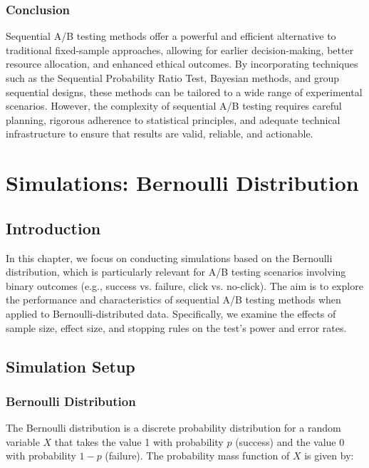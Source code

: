 \documentclass[magisterska, english]{pwr_wmat_praca_dyplomowa}
\theoremstyle{plain}
\numberwithin{theorem}{chapter}
\theoremstyle{definition}
\numberwithin{theorem}{chapter}
\begin{document}
\subsection{Conclusion}

Sequential A/B testing methods offer a powerful and efficient alternative to traditional fixed-sample approaches, allowing for earlier decision-making, better resource allocation, and enhanced ethical outcomes. By incorporating techniques such as the Sequential Probability Ratio Test, Bayesian methods, and group sequential designs, these methods can be tailored to a wide range of experimental scenarios. However, the complexity of sequential A/B testing requires careful planning, rigorous adherence to statistical principles, and adequate technical infrastructure to ensure that results are valid, reliable, and actionable.



\chapter{Simulations: Bernoulli Distribution}
\label{chap:bernoulli_simulations}

\section{Introduction}

In this chapter, we focus on conducting simulations based on the Bernoulli distribution, which is particularly relevant for A/B testing scenarios involving binary outcomes (e.g., success vs. failure, click vs. no-click). The aim is to explore the performance and characteristics of sequential A/B testing methods when applied to Bernoulli-distributed data. Specifically, we examine the effects of sample size, effect size, and stopping rules on the test's power and error rates.

\section{Simulation Setup}

\subsection{Bernoulli Distribution}

The Bernoulli distribution is a discrete probability distribution for a random variable \( X \) that takes the value 1 with probability \( p \) (success) and the value 0 with probability \( 1-p \) (failure). The probability mass function of \( X \) is given by:
\end{document}
